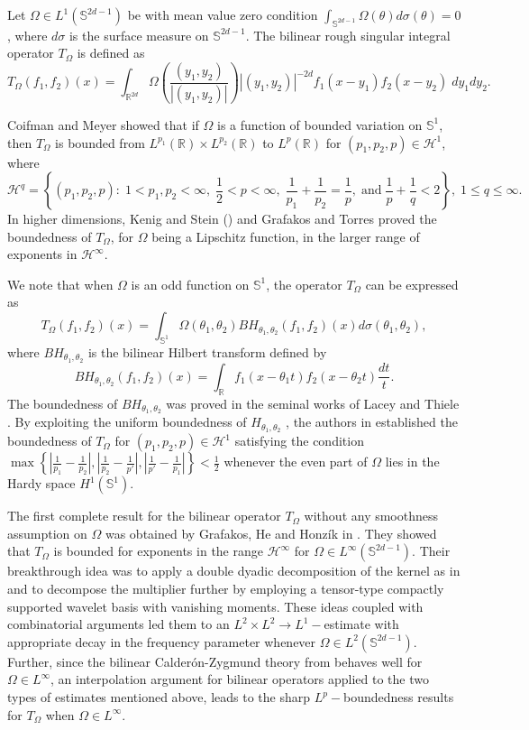 \documentclass[a4paper,reqno]{amsart}
\newcommand{\R}{{\mathbb R}}       %
\newcommand{\Sp}{{\mathbb S}}
\theoremstyle{definition}
\numberwithin{equation}{section}
\begin{document}
Let $\Omega\in L^1(\Sp^{2d-1})$ be with mean value zero condition $\int_{\Sp^{2d-1}}\Omega(\theta)d\sigma(\theta)=0$, where $d\sigma$ is the surface measure on $\Sp^{2d-1}$. The bilinear rough singular integral operator $T_{\Omega}$ is defined as
\[T_{\Omega}(f_1,f_2)(x)=\int_{\R^{2d}}\Omega\left(\frac{(y_1,y_2)}{|(y_1,y_2)|}\right){|(y_1,y_2)|^{-2d}}f_1(x-y_1)f_2(x-y_2)\;dy_1dy_2.\]

Coifman and Meyer \cite[Theorem I]{CF1975} showed that if $\Omega$ is a function of bounded variation on $\Sp^1$, then $T_\Omega$ is bounded from $L^{p_1}(\R)\times L^{p_2}(\R)$ to $L^{p}(\R)$ for $(p_1,p_2,p)\in\mathcal{H}^1$, where 
\[\mathcal{H}^q=\left\{(p_1,p_2,p):\;1<p_1,p_2<\infty,\;\frac{1}{2}<p<\infty,\;\frac{1}{p_1}+\frac{1}{p_2}=\frac{1}{p},\;\text{and}\;\frac{1}{p}+\frac{1}{q}<2\right\},\;1\leq q\leq\infty.\]
In higher dimensions, Kenig and Stein (\cite{KenigStein}) and Grafakos and Torres \cite{GT2002} proved the boundedness of $T_\Omega$, for $\Omega$ being a Lipschitz function, in the larger range of exponents in $\mathcal{H}^\infty$. 

We note that when $\Omega$ is an odd function on $\Sp^1$, the operator $T_\Omega$ can be expressed as
\[T_\Omega(f_1,f_2)(x)=\int_{\Sp^1}\Omega(\theta_1,\theta_2)BH_{\theta_1,\theta_2}(f_1,f_2)(x)d\sigma(\theta_1,\theta_2),\]
where $BH_{\theta_1,\theta_2}$ is the bilinear Hilbert transform defined by
\[BH_{\theta_1,\theta_2}(f_1,f_2)(x)=\int_\R f_1(x-\theta_1t)f_2(x-\theta_2t)\frac{dt}{t}.\]
The boundedness of $BH_{\theta_1,\theta_2}$ was proved in the seminal works of Lacey and Thiele \cite{LT1997, LT1999}. By exploiting the uniform boundedness of $H_{\theta_1,\theta_2}$ \cite{GL2004,Li2006}, the authors in \cite{DGHST2011} established the boundedness of $T_\Omega$ for $(p_1,p_2,p)\in\mathcal{H}^1$ satisfying the condition  $\max\left\{\left|\frac{1}{p_1}-\frac{1}{p_2}\right|,\left|\frac{1}{p_2}-\frac{1}{p'}\right|,\left|\frac{1}{p'}-\frac{1}{p_1}\right|\right\}<\frac{1}{2}$ whenever the even part of $\Omega$ lies in the Hardy space $H^1(\Sp^1)$. 

The first complete result for the bilinear operator $T_\Omega$ without any smoothness assumption on $\Omega$ was obtained by Grafakos, He and Honz\'ik in \cite{GHH2018}. They showed that $T_\Omega$ is bounded for exponents in the range $\mathcal{H}^\infty$ for $\Omega\in L^\infty(\Sp^{2d-1})$. Their breakthrough idea was to apply a double dyadic decomposition of the kernel as in \cite{DR1986} and to decompose the multiplier further by employing a tensor-type compactly supported wavelet basis with vanishing moments. These ideas coupled with combinatorial arguments led them to an $L^2\times L^2\to L^1-$estimate with appropriate decay in the frequency parameter whenever $\Omega\in L^2(\Sp^{2d-1})$. Further, since the bilinear Calder\'on-Zygmund theory from \cite{GT2002} behaves well for $\Omega\in L^\infty$, an interpolation argument for bilinear operators applied to the two types of estimates mentioned above, leads to the sharp $L^p-$boundedness results for $T_\Omega$ when $\Omega\in L^\infty$. 
\end{document}

